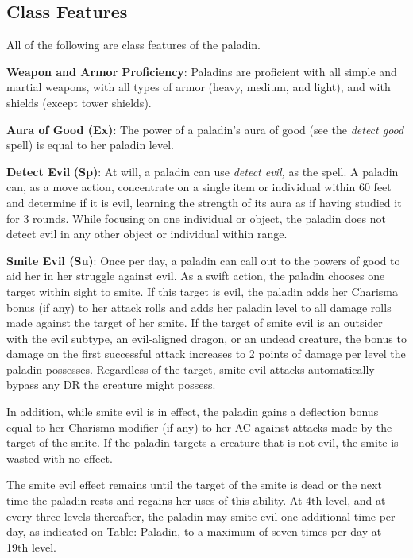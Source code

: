 \subsection{Class Features}

				
All of the following are class features of the paladin.
				
\textbf{Weapon and Armor Proficiency}: Paladins are proficient with all simple and martial weapons, with all types of armor (heavy, medium, and light), and with shields (except tower shields).
				
\textbf{Aura of Good (Ex)}: The power of a paladin's aura of good (see the \textit{detect good} spell) is equal to her paladin level.
				
\textbf{Detect Evil} \textbf{(Sp)}: At will, a paladin can use \textit{detect evil,} as the spell. A paladin can, as a move action, concentrate on a single item or individual within 60 feet and determine if it is evil, learning the strength of its aura as if having studied it for 3 rounds. While focusing on one individual or object, the paladin does not detect evil in any other object or individual within range.
				
\textbf{Smite Evil (Su)}: Once per day, a paladin can call out to the powers of good to aid her in her struggle against evil. As a swift action, the paladin chooses one target within sight to smite. If this target is evil, the paladin adds her Charisma bonus (if any) to her attack rolls and adds her paladin level to all damage rolls made against the target of her smite. If the target of smite evil is an outsider with the evil subtype, an evil-aligned dragon, or an undead creature, the bonus to damage on the first successful attack increases to 2 points of damage per level the paladin possesses. Regardless of the target, smite evil attacks automatically bypass any DR the creature might possess.
				
In addition, while smite evil is in effect, the paladin gains a deflection bonus equal to her Charisma modifier (if any) to her AC against attacks made by the target of the smite. If the paladin targets a creature that is not evil, the smite is wasted with no effect.
				
The smite evil effect remains until the target of the smite is dead or the next time the paladin rests and regains her uses of this ability. At 4th level, and at every three levels thereafter, the paladin may smite evil one additional time per day, as indicated on Table: Paladin, to a maximum of seven times per day at 19th level.
				
